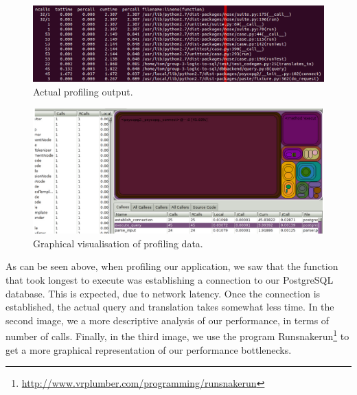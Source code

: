 \documentclass[a4paper, 11pt]{article}
\begin{document}
      \begin{figure}[H]
        \includegraphics[width=1.0\textwidth]{images/4.png}
        \caption{Actual profiling output.}
      \end{figure}

      \begin{figure}[H]
        \includegraphics[width=1.0\textwidth]{images/5.png}
        \caption{Graphical visualisation of profiling data.}
      \end{figure}

      As can be seen above, when profiling our application, we saw that the
      function that took longest to execute was establishing a connection to
      our PostgreSQL database. This is expected, due to network latency. Once
      the connection is established, the actual query and translation takes
      somewhat less time. In the second image, we a more descriptive analysis
      of our performance, in terms of number of calls. Finally, in the third
      image, we use the program
      Runsnakerun\footnote{\url{http://www.vrplumber.com/programming/runsnakerun}}
      to get a more graphical representation of our performance bottlenecks.
\end{document}
